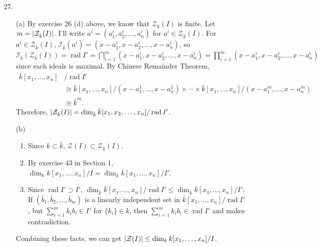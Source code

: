 \documentclass[12pt]{article}
\DeclareMathOperator{\rad}{\mathrm{rad}}
\newcommand{\I}{\mathcal{I}}
\newcommand{\Z}{\mathcal{Z}}
\begin{document}
\begin{enumerate}
\item[27.] \begin{enumerate}\item[(a)]
By exercise 26 (d) above, we know that $\Z_{\bar{k}}(I)$ is finite. Let $m=\abs{\Z_{\bar{k}}(I)}$. I'll write $a^i=(a_1^i, a_2^i, \ldots, a_n^i)$ for $a^i\in \Z_{\bar{k}}(I)$. For $a^i\in  \Z_{\bar{k}}(I)$, $\I_{\bar{k}}(a^i)=(x-a^i_1, x-a^i_2, \ldots, x-a^i_n)$, so $\I_{\bar{k}}\left(\Z_{\bar{k}}(I)\right)=\rad I'=\bigcap_{i=1}^m (x-a^i_1, x-a^i_2, \ldots, x-a^i_n)=\prod_{i=1}^m (x-a^i_1, x-a^i_2, \ldots, x-a^i_n)$ since each ideals is maximal. By Chinese Remainder Theorem,
\begin{equation*}
\begin{split}
\bar{k}[x_1, \ldots, x_n]&/\rad I'\\
&\cong \bar{k}[x_1, \ldots, x_n]/(x-a^1_1, \ldots, x-a^1_n) \times \cdots \times \bar{k}[x_1, \ldots, x_n]/(x-a^m_1, \ldots, x-a^m_n)\\
&\cong \bar{k}^m.
\end{split}
\end{equation*}
Therefore, $\abs{\Z_{\bar{k}}(I)}=\dim_{\bar{k}}\bar{k}[x_1, x_2, \ldots, x_n]/\rad I'$.
\item[(b)] \begin{enumerate}
\item Since $k\subset \bar{k}$, $\Z(I)\subset \Z_{\bar{k}}(I)$. 
\item By exercise 43 in Section 1, $\dim_k k[x_1, \ldots, x_n]/I=\dim_{\bar{k}} \bar{k}[x_1, \ldots, x_n]/I'$.
\item Since $\rad I'\supset I'$, $\dim_{\bar{k}} \bar{k}[x_1, \ldots, x_n]/\rad I'\leq \dim_{\bar{k}} \bar{k}[x_1, \ldots, x_n]/ I'$: If $(\bar{b}_1, \bar{b}_2, \ldots, \bar{b}_m)$ is a linearly independent set in $\bar{k}[x_1, \ldots, x_n]/\rad I'$, but $\sum_{i=1}^m k_i b_i \in I'$ for $\{k_i\}\in k$, then $\sum_{i=1}^m k_i b_i\in \rad I'$ and makes contradiction.
\end{enumerate}
Combining these facts, we can get $\abs{\Z(I)}\leq \dim_k k[x_1, \ldots, x_n]/I$.
\end{enumerate}
\end{enumerate}
\end{document}
